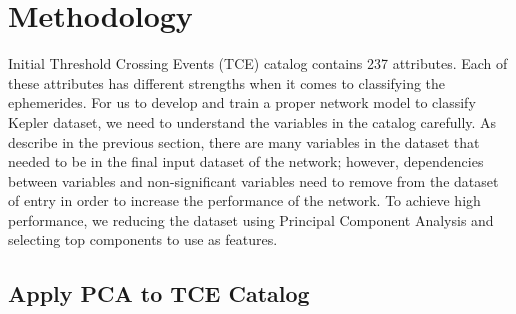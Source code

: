 \chapter{Methodology}




Initial Threshold Crossing Events (TCE) catalog contains 237 attributes. Each of these attributes has different strengths when it comes to classifying the ephemerides. For us to develop and train a proper network model to classify Kepler dataset, we need to understand the variables in the catalog carefully. As describe in the previous section,  there are many variables in the dataset that needed to be in the final input dataset of the network; however, dependencies between variables and non-significant variables need to remove from the dataset of entry in order to increase the performance of the network. To achieve high performance, we reducing the dataset using Principal Component Analysis and selecting top components to use as features. 


\section{Apply PCA to TCE Catalog }